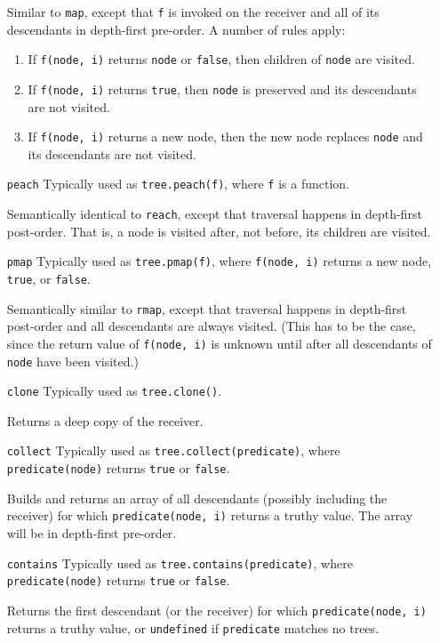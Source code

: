 \documentclass{report}
\begin{document}
\begin{enumerate}
  Similar to {\tt map}, except that {\tt f} is invoked on the receiver and all of its descendants in depth-first pre-order. A number of rules apply:

\begin{enumerate}
\item{If {\tt f(node, i)} returns {\tt node} or {\tt false}, then children of {\tt node} are visited.}
\item{If {\tt f(node, i)} returns {\tt true}, then {\tt node} is preserved and its descendants are not visited.}
\item{If {\tt f(node, i)} returns a new node, then the new node replaces {\tt node} and its descendants are not visited.}
\end{enumerate}

\item[{\tt peach}]
  Typically used as {\tt tree.peach(f)}, where {\tt f} is a function.

  Semantically identical to {\tt reach}, except that traversal happens in depth-first post-order. That is, a node is visited after, not before, its children are visited.

\item[{\tt pmap}]
  Typically used as {\tt tree.pmap(f)}, where {\tt f(node, i)} returns a new node, {\tt true}, or {\tt false}.

  Semantically similar to {\tt rmap}, except that traversal happens in depth-first post-order and all descendants are always visited. (This has to be the case, since the return value of
  {\tt f(node, i)} is unknown until after all descendants of {\tt node} have been visited.)

\item[{\tt clone}]
  Typically used as {\tt tree.clone()}.

  Returns a deep copy of the receiver.

\item[{\tt collect}]
  Typically used as {\tt tree.collect(predicate)}, where {\tt predicate(node)} returns {\tt true} or {\tt false}.

  Builds and returns an array of all descendants (possibly including the receiver) for which {\tt predicate(node, i)} returns a truthy value. The array will be in depth-first pre-order.

\item[{\tt contains}]
  Typically used as {\tt tree.contains(predicate)}, where {\tt predicate(node)} returns {\tt true} or {\tt false}.

  Returns the first descendant (or the receiver) for which {\tt predicate(node, i)} returns a truthy value, or {\tt undefined} if {\tt predicate} matches no trees.
\end{enumerate}
\end{document}
